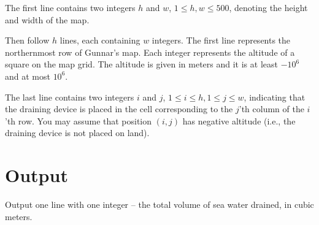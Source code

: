 The first line contains two integers $h$ and $w$, $1 \leq h, w \leq 500$, denoting the height and
width of the map.

Then follow $h$ lines, each containing $w$ integers. The first line represents the northernmost row
of Gunnar's map. Each integer represents the altitude of a square on the map grid. The altitude is
given in meters and it is at least $-10^6$ and at most $10^6$.

The last line contains two integers $i$ and $j$, $1 \leq i \leq h,
1 \leq j \leq w$, indicating that the draining device is placed in the
cell corresponding to the $j$'th column of the $i$'th row.  You may
assume that position $(i, j)$ has negative altitude (i.e., the
draining device is not placed on land).


\section*{Output}

Output one line with one integer -- the total volume of sea water drained, in cubic meters.
